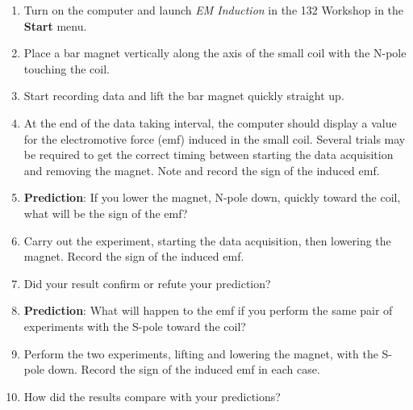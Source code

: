 \begin{enumerate}
\item Turn on the computer and launch {\it EM Induction} in the 132 Workshop in the {\bf Start} menu.

\item Place a bar magnet vertically along the axis of the small coil with
the N-pole touching the coil.

\item Start recording data and lift the bar magnet quickly straight up.

\item At the end of the data taking interval, the computer should display
a value for the electromotive force (emf) induced in the small coil.
Several trials may be required to get the correct timing between starting
the data acquisition and removing the magnet. Note and record the sign of the induced
emf.\vspace{10mm}

\item \textbf{Prediction}: If you lower the magnet, N-pole down, quickly
toward the coil, what will be the sign of the emf? \vspace{15mm}

\item Carry out the experiment, starting the data acquisition, then lowering the magnet.
Record the sign of the induced emf.\vspace{10mm}

\item Did your result confirm or refute your prediction?\vspace{15mm}

\item \textbf{Prediction}: What will happen to the emf if you perform the
same pair of experiments with the S-pole toward the coil? \vspace{15mm}

\item Perform the two experiments, lifting and lowering the magnet, with
the S-pole down. Record the sign of the induced emf in each case.\vspace{10mm}

\item How did the results compare with your predictions?\vspace{15mm}

\end{enumerate}

